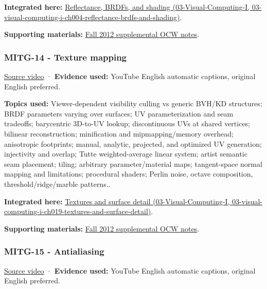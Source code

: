 \textbf{Integrated here:} \href{../03-Visual-Computing-I/main.pdf\#nameddest=03-visual-computing-i-ch004-reflectance-brdfs-and-shading}{Reflectance, BRDFs, and shading (03-Visual-Computing-I, 03-visual-computing-i-ch004-reflectance-brdfs-and-shading)}.

\textbf{Supporting materials:} \href{https://ocw.mit.edu/courses/6-837-computer-graphics-fall-2012/pages/lecture-notes/}{Fall 2012 supplemental OCW notes}.

\subsubsection{MITG-14 - Texture mapping}\label{04-visual-computing-ii-ch036-mitg-14---texture-mapping}

\href{https://www.youtube.com/watch?v=TQTciMjuxrY}{Source video} · \textbf{Evidence used:} YouTube English automatic captions, original English preferred.

\textbf{Topics used:} Viewer-dependent visibility culling vs generic BVH/KD structures; BRDF parameters varying over surfaces; UV parameterization and seam tradeoffs; barycentric 3D-to-UV lookup; discontinuous UVs at shared vertices; bilinear reconstruction; minification and mipmapping/memory overhead; anisotropic footprints; manual, analytic, projected, and optimized UV generation; injectivity and overlap; Tutte weighted-average linear system; artist semantic seam placement; tiling; arbitrary parameter/material maps; tangent-space normal mapping and limitations; procedural shaders; Perlin noise, octave composition, threshold/ridge/marble patterns..

\textbf{Integrated here:} \href{../03-Visual-Computing-I/main.pdf\#nameddest=03-visual-computing-i-ch019-textures-and-surface-detail}{Textures and surface detail (03-Visual-Computing-I, 03-visual-computing-i-ch019-textures-and-surface-detail)}.

\textbf{Supporting materials:} \href{https://ocw.mit.edu/courses/6-837-computer-graphics-fall-2012/pages/lecture-notes/}{Fall 2012 supplemental OCW notes}.

\subsubsection{MITG-15 - Antialiasing}\label{04-visual-computing-ii-ch036-mitg-15---antialiasing}

\href{https://www.youtube.com/watch?v=eHXDosme1eo}{Source video} · \textbf{Evidence used:} YouTube English automatic captions, original English preferred.

